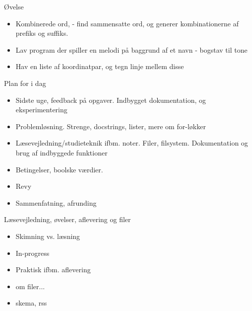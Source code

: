 \documentclass[a4paper,landscape]{slides}
\begin{document}
\begin{slide}
	\begin{center} {\large 
            Øvelse
	} \end{center}
	\begin{itemize} \addtolength{\itemsep}{-\baselineskip}
            \item Kombinerede ord, - find sammensatte ord, og generer kombinationerne af prefiks og suffiks.
            \item Lav program der spiller en melodi på baggrund af et navn - bogstav til tone
            \item Hav en liste af koordinatpar, og tegn linje mellem disse
	\end{itemize}
\end{slide}

\begin{slide}
	\begin{center} {\large 
            Plan for i dag
	} \end{center}
	\begin{itemize} \addtolength{\itemsep}{-\baselineskip}
    		\item Sidste uge, feedback på opgaver. Indbygget dokumentation, og eksperimentering
    		\item Problemløsning. Strenge, docstrings, lister, mere om for-løkker
    		\item Læsevejledning/studieteknik ifbm. noter. Filer, filsystem. Dokumentation og brug af indbyggede funktioner
    		\item Betingelser, boolske værdier.
    		\item Revy
    		\item Sammenfatning, afrunding
	\end{itemize}
\end{slide}

\begin{slide}
	\begin{center} {\large 
            Læsevejledning, øvelser, aflevering og filer
	} \end{center}
	\begin{itemize} \addtolength{\itemsep}{-\baselineskip}
            \item Skimning vs. læsning
            \item In-progress
            \item Praktisk ifbm. aflevering
            \item om filer...
            \item skema, rss
	\end{itemize}
\end{slide}
\end{document}
